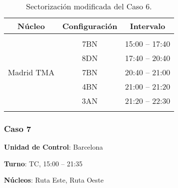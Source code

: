 \begin{table}[h]
	\centering
	\caption{Sectorización modificada del Caso 6.}
	\label{table:D:caso6-modif}
	\begin{tabular}{ccc}
		\hline
		\multicolumn{1}{c}{\textbf{Núcleo}}              & \multicolumn{1}{c}{\textbf{Configuración}} & \multicolumn{1}{c}{\textbf{Intervalo}} \\ \hline
		&                                            &                                        \\
		\multicolumn{1}{l|}{\multirow{5}{*}{Madrid TMA}} & 7BN                                        & 15:00 -- 17:40                         \\
		\multicolumn{1}{l|}{}                            & 8DN                                        & 17:40 -- 20:40                         \\
		\multicolumn{1}{l|}{}                            & 7BN                                        & 20:40 -- 21:00                         \\
		\multicolumn{1}{l|}{}                            & 4BN                                        & 21:00 -- 21:20                         \\
		\multicolumn{1}{l|}{}                            & 3AN                                        & 21:20 -- 22:30                         \\
		\multicolumn{1}{c}{}                             &                                            &                                        \\ \hline
	\end{tabular}
\end{table}


\subsubsection{Caso 7}

\textbf{Unidad de Control}: Barcelona

\textbf{Turno}: TC, 15:00 -- 21:35


\textbf{Núcleos}: Ruta Este, Ruta Oeste

